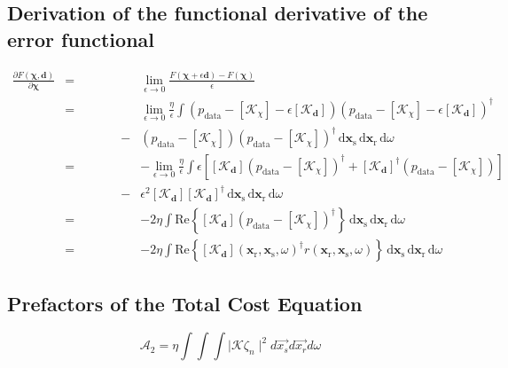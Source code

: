 \documentclass[10pt,a4paper]{article}
\newcommand{\partder}[2]{\ensuremath{\frac{\partial #1}{\partial #2}}}
\newcommand{\df}[1]{\, \ensuremath{\mbox{d}#1}}
\newcommand{\real}[1]{\text{Re} \left\{ #1 \right\}}
\newcommand{\xs}{\mathbf{x}_\text{s}}
\newcommand{\xr}{\mathbf{x}_\text{r}}
\begin{document}
\subsection{Derivation of the functional derivative of the error functional}
\label{deriveerrorfunctional}
\begin{eqnarray*}
\partder{F(\mathbf{\chi}, \mathbf{d})}{\mathbf{\chi}} & = & \lim_{\epsilon \rightarrow 0} \frac{F(\mathbf{\chi} + \epsilon \mathbf{d}) - F(\mathbf{\chi})}{\epsilon} \\
& = & \lim_{\epsilon \rightarrow 0} \frac{\eta}{\epsilon} \int \left(p_{\text{data}} - \left[\mathcal{K}_\chi \right] - \epsilon \left[\mathcal{K}_\mathbf{d} \right] \right) \left(p_{\text{data}} - \left[\mathcal{K}_\chi \right] - \epsilon \left[\mathcal{K}_\mathbf{d} \right] \right)^{\dagger}\\
& \, \, \, \, \, \, \, \, \, \, \, \, \, \, \, \, \, \, \, \, \, \, \, \, \, \, \, - & \left(p_{\text{data}} - \left[\mathcal{K}_\chi \right] \right) \left(p_{\text{data}} - \left[\mathcal{K}_\chi \right] \right)^{\dagger} \df{\xs} \df{\xr} \df{\omega} \\
& = & -\lim_{\epsilon \rightarrow 0} \frac{\eta}{\epsilon} \int \epsilon \left[ \left[\mathcal{K}_\mathbf{d} \right] \left(p_{\text{data}} - \left[\mathcal{K}_\chi \right]  \right)^{\dagger} + \left[\mathcal{K}_\mathbf{d} \right]^{\dagger} \left(p_{\text{data}} - \left[\mathcal{K}_\chi \right] \right) \right] \\
& \, \, \, \, \, \, \, \, \, \, \, \, \, \, \, \, \, \, \, \, \, \, \, \, \, \, \, - & \epsilon^2 \left[\mathcal{K}_\mathbf{d} \right] \left[\mathcal{K}_\mathbf{d} \right]^{\dagger} \df{\xs} \df{\xr} \df{\omega} \\
& = & -2 \eta \int \real{\left[\mathcal{K}_\mathbf{d} \right] \left(p_{\text{data}} - \left[\mathcal{K}_\chi \right]  \right)^{\dagger}} \df{\xs} \df{\xr} \df{\omega} \\
& = & -2 \eta \int \real{\left[\mathcal{K}_\mathbf{d} \right](\xr, \xs, \omega)^{\dagger} r (\xr, \xs, \omega)} \df{\xs} \df{\xr} \df{\omega}
\end{eqnarray*}

\subsection{Prefactors of the Total Cost Equation}
\label{totalcostprefactors}
\begin{equation} \label{eq:eq24} \mathcal{A}_2 = \eta \int \int \int \mid \mathcal{K} \zeta_n \mid^2 d\vec{x_s}d\vec{x_r}d\omega \end{equation}
\end{document}
